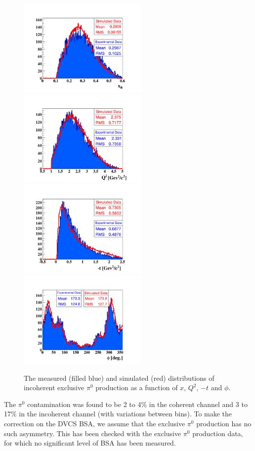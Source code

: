 \documentclass[aps,prc,preprint,superscriptaddress]{revtex4}
\begin{document}
\begin{figure}[p]
\center
\includegraphics[trim=70 15 70 70,clip,width=6.3cm]{fig3/pi0/xB_InCoh_pi0.png}
\includegraphics[trim=70 15 70 70,clip,width=6.3cm]{fig3/pi0/Q2_InCoh_pi0.png}
\includegraphics[trim=70 15 70 70,clip,width=6.3cm]{fig3/pi0/t_InCoh_pi0.png}
\includegraphics[trim=70 15 70 70,clip,width=6.3cm]{fig3/pi0/phi_h_InCoh_pi0.png}
	\caption{The measured (filled blue) and simulated (red) distributions of
	incoherent exclusive $\pi^0$ production as a function of $x$, $Q^2$, $-t$ and $\phi$.}
\label{fig:InCohPi0Simul}
\end{figure}


The $\pi^0$ contamination was found to be 2 to 4\% in the coherent channel and 3 to 17\% in the incoherent
channel (with variations between bins). To make the correction on the DVCS BSA, we assume that
the exclusive $\pi^0$ production has no such asymmetry. This has been checked with the exclusive 
$\pi^0$ production data, for which no significant level of BSA has been measured.
\end{document}
